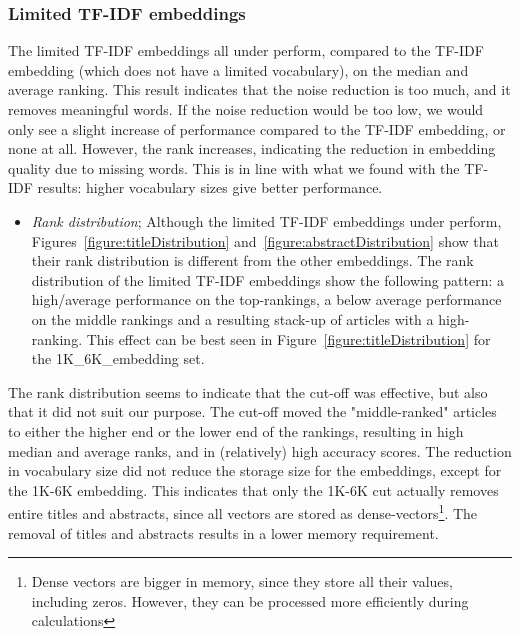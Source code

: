\documentclass[runningheads]{llncs}
\begin{document}
\subsubsection{Limited TF-IDF embeddings}
The limited TF-IDF embeddings all under perform, compared to the TF-IDF embedding (which does not have a limited vocabulary), on the median and average ranking. This result indicates that the noise reduction is too much, and it removes meaningful words. If the noise reduction would be too low, we would only see a slight increase of performance compared to the TF-IDF embedding, or none at all. However, the rank increases, indicating the reduction in embedding quality due to missing words. This is in line with what we found with the TF-IDF results: higher vocabulary sizes give better performance. 
\begin{itemize}
\item{\textit{Rank distribution}; Although the limited TF-IDF embeddings under perform, Figures~\ref{figure:titleDistribution} and~\ref{figure:abstractDistribution} show that their rank distribution is different from the other embeddings. The rank distribution of the limited TF-IDF embeddings show the following pattern: a high/average performance on the top-rankings, a below average performance on the middle rankings and a resulting stack-up of articles with a high-ranking. This effect can be best seen in Figure~\ref{figure:titleDistribution} for the 1K\_6K\_embedding set.}
\end{itemize}
The rank distribution seems to indicate that the cut-off was effective, but also that it did not suit our purpose. The cut-off moved the "middle-ranked"  articles to either the higher end or the lower end of the rankings, resulting in high median and average ranks, and in (relatively) high accuracy scores. The reduction in vocabulary size did not reduce the storage size for the embeddings, except for the 1K-6K embedding. This indicates that only the 1K-6K cut actually removes entire titles and abstracts, since all vectors are stored as dense-vectors\footnote{Dense vectors are bigger in memory, since they store all their values, including zeros. However, they can be processed more efficiently during calculations}. The removal of titles and abstracts results in a lower memory requirement.
\end{document}
